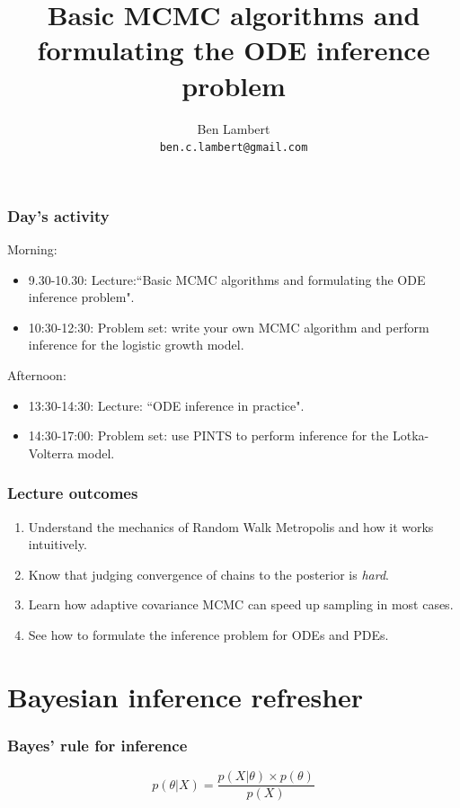 \documentclass[handout]{beamer}
\title{Basic MCMC algorithms and formulating the ODE inference problem}
\author[Ben Lambert]{Ben Lambert\inst{1}\\ \texttt{ben.c.lambert@gmail.com}}
\date{\displaydate{date}}
\institute[University of Oxford]{
	\inst{1}University of Oxford}
\begin{document}
\begin{frame}
\titlepage
\end{frame}


\begin{frame}
	\frametitle{Day's activity}
	
	Morning:
	
	\begin{itemize}
		\item 9.30-10.30: Lecture:``Basic MCMC algorithms and formulating the ODE inference problem".
		\item 10:30-12:30: Problem set: write your own MCMC algorithm and perform inference for the logistic growth model.
	\end{itemize}
	
	Afternoon:
	
	\begin{itemize}
		\item 13:30-14:30: Lecture: ``ODE inference in practice".
		\item 14:30-17:00: Problem set: use PINTS to perform inference for the Lotka-Volterra model.
	\end{itemize}
	
\end{frame}


\begin{frame}
\frametitle{Lecture outcomes}

\begin{enumerate}
\item Understand the mechanics of Random Walk Metropolis and how it works intuitively.
\item Know that judging convergence of chains to the posterior is \textit{hard}.
\item Learn how adaptive covariance MCMC can speed up sampling in most cases.
\item See how to formulate the inference problem for ODEs and PDEs.
\end{enumerate}

\end{frame}

\section{Bayesian inference refresher}
\frame{\tableofcontents[currentsection]}

\begin{frame}
	\frametitle{Bayes' rule for inference}
	
	
	\Large
	\begin{equation}
	p(\theta|X) = \frac{p(X|\theta)\times p(\theta)}{p(X)}
	\end{equation}
	
\end{frame}
\end{document}
